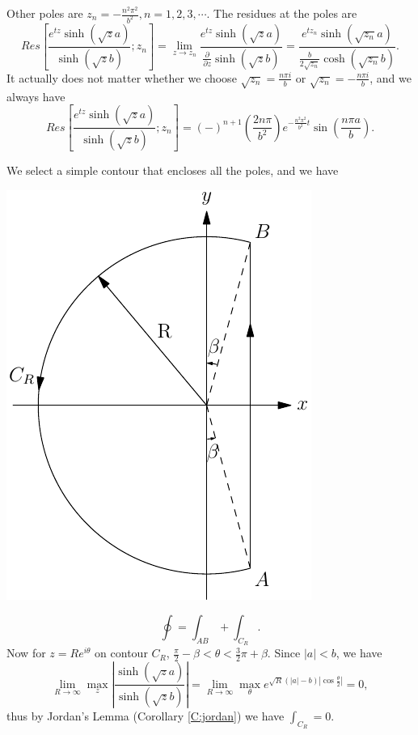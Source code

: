 Other poles are $z_n=-\frac{n^2 \pi^2}{b^2},n=1,2,3,\cdots$. 
The residues at the poles are
\[
	Res\left[ \frac{e^{tz} \sinh (\sqrt{z} a)}{\sinh (\sqrt{z} b)}; z_n \right] 
	= \lim_{z\to z_n} 
	  \frac{e^{t z} \sinh (\sqrt{z} a)}
	       { \frac{ \partial }{ \partial z } \sinh (\sqrt{z} b) }
	=  \frac{e^{t z_n} \sinh (\sqrt{z_n} a)}
          { \frac{b}{2\sqrt{z_n}} \cosh (\sqrt{z_n} b) }.
\]
It actually does not matter whether we choose $\sqrt{z_n}=\frac{n\pi i}{b}$ 
or $\sqrt{z_n}=- \frac{n\pi i}{b}$, and we always have
\[
	Res\left[ \frac{e^{tz} \sinh (\sqrt{z} a)}{\sinh (\sqrt{z} b)}; z_n \right] 
	= (-)^{n+1} \left( \frac{2n\pi}{b^2} \right) e^{-\frac{n^2\pi^2}{b^2} t} 
	  \sin(\frac{n\pi a}{b}).
\]

We select a simple contour that encloses all the poles, and we have

\begin{marginfigure} 
  \includegraphics{graphics/contour_simple.pdf}
\end{marginfigure}

\[
	\oint = \int_{AB} + \int_{C_R}.
\]
Now for $z=R e^{i\theta}$ on contour $C_R$,
$\frac{\pi}{2}-\beta<\theta<\frac{3}{2}\pi+\beta$. Since $|a|<b$, we have
\[
	\lim_{R\to\infty} \max_z \left| \frac{\sinh(\sqrt{z} a)}{\sinh (\sqrt{z} b)}
	\right|
	= \lim_{R\to\infty} \max_{\theta} e^{\sqrt{R} (|a|-b) |\cos\frac{\theta}{2}|}
	=0,
\]
thus by Jordan's Lemma (Corollary \ref{C:jordan}) we have $\int_{C_R}=0$.

